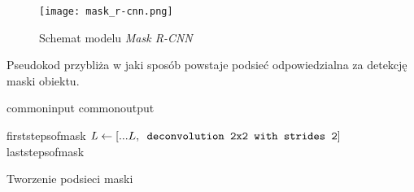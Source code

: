 \begin{figure}[h]
  \centering
  \caption{Schemat modelu \textit{Mask R-CNN}}
  \texttt{[image: mask\_r-cnn.png]}
  \label{fig:mask_r_cnn}
\end{figure}

Pseudokod  przybliża w jaki sposób powstaje podsieć odpowiedzialna za detekcję maski obiektu.

\begin{algorithm}
  {commoninput}
  {commonoutput}
  \begin{algorithmic}[1]
    {firststepsofmask}
    \State $\mathit{L} \gets [...L,\verb| deconvolution 2x2 with strides 2|]$
    {laststepsofmask}
	\end{algorithmic}
	\caption{Tworzenie podsieci maski}
	\label{alg:mask-r-cnn}
\end{algorithm}
